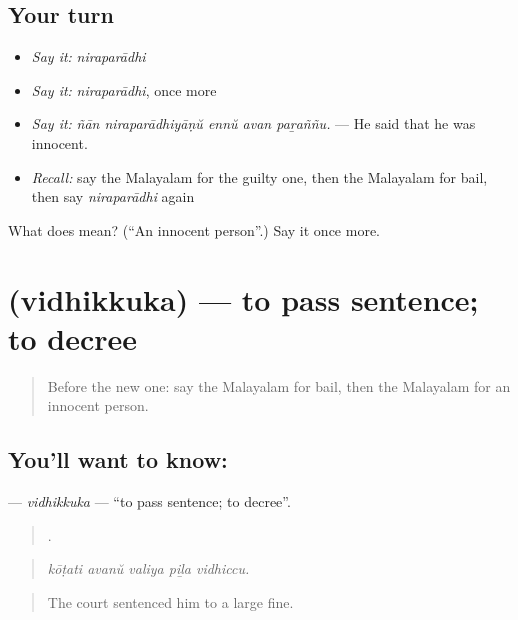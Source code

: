 \subsection*{Your turn}
\begin{itemize}
\raggedright
  \item \emph{Say it:} \emph{niraparādhi}
  \item \emph{Say it:} \emph{niraparādhi}, once more
  \item \emph{Say it:} \emph{ñān niraparādhiyāṇŭ ennŭ avan paṟaññu.} — He said that he was innocent.
  \item \emph{Recall:} say the Malayalam for the guilty one, then the Malayalam for bail, then say \emph{niraparādhi} again
\end{itemize}

\begin{tcolorbox}[breakable,colback=teal!4,colframe=teal!35!black,title={Before you move on}]
What does  mean? (\textquotedblleft{}An innocent person\textquotedblright{}.) Say it once more.
\end{tcolorbox}
\section[\texorpdfstring{\ml{വിധിക്കുക} (vidhikkuka)}{വിധിക്കുക (vidhikkuka)}]{ (vidhikkuka) — to pass sentence; to decree}

\label{lesson:ML-C369-vidhikkuka}



\begin{quote}
Before the new one: say the Malayalam for bail, then the Malayalam for an innocent person.
\end{quote}

\subsection*{You'll want to know: }
\textbf{} — \emph{vidhikkuka} — \textquotedblleft{}to pass sentence; to decree\textquotedblright{}.

\begin{quote}
    .
\end{quote}

\begin{quote}
\emph{kōṭati avanŭ valiya piḻa vidhiccu.}
\end{quote}

\begin{quote}
The court sentenced him to a large fine.
\end{quote}

